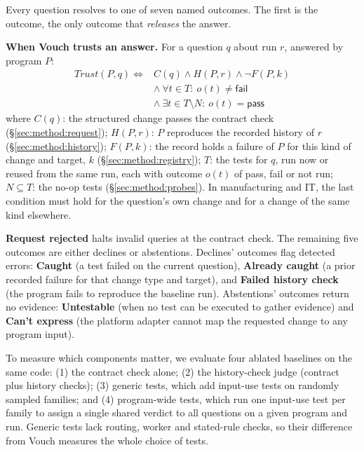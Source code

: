 Every question resolves to one of seven named outcomes. The first is the \textbf{\Trusted} outcome, the only outcome that \emph{releases} the answer.
\begin{rulebox}
\small
\noindent\textbf{When Vouch trusts an answer.} For a question $q$ about run $r$, answered by program $P$:
\[\begin{aligned}
\mathit{Trust}(P,q) \iff{} & C(q) \wedge H(P,r) \wedge \neg F(P,k)\\
& \wedge\ \forall t\in T:\ o(t)\neq \mathsf{fail}\\
& \wedge\ \exists t\in T\setminus N:\ o(t)= \mathsf{pass}
\end{aligned}\]
\footnotesize
where $C(q)$: the structured change passes the contract check (\S\ref{sec:method:request}); $H(P,r)$: $P$ reproduces the recorded history of $r$ (\S\ref{sec:method:history}); $F(P,k)$: the record holds a failure of $P$ for this kind of change and target, $k$ (\S\ref{sec:method:registry}); $T$: the tests for $q$, run now or reused from the same run, each with outcome $o(t)$ of pass, fail or not run; $N\subseteq T$: the no-op tests (\S\ref{sec:method:probes}). In manufacturing and IT, the last condition must hold for the question's own change and for a change of the same kind elsewhere.
\end{rulebox}
\noindent \textbf{Request rejected} halts invalid queries at the contract check. The remaining five outcomes are  either declines or abstentions. Declines' outcomes flag detected errors: \textbf{Caught} (a test failed on the current question), \textbf{Already caught} (a prior recorded failure for that change type and target), and \textbf{Failed history check} (the program fails to reproduce the baseline run). Abstentions' outcomes return no evidence:  \textbf{Untestable} (when no test can be executed to gather evidence) and \textbf{Can't express} (the platform adapter cannot map the requested change to any program input).

To measure which components matter, we evaluate four ablated baselines on the same code: (1) the contract check alone; (2) the history-check judge (contract plus history checks); (3) generic tests, which add input-use tests on randomly sampled families; and (4) program-wide tests, which run one input-use test per family to assign a single shared verdict to all questions on a given program and run. Generic tests lack routing, worker and stated-rule checks, so their difference from Vouch measures the whole choice of tests.
